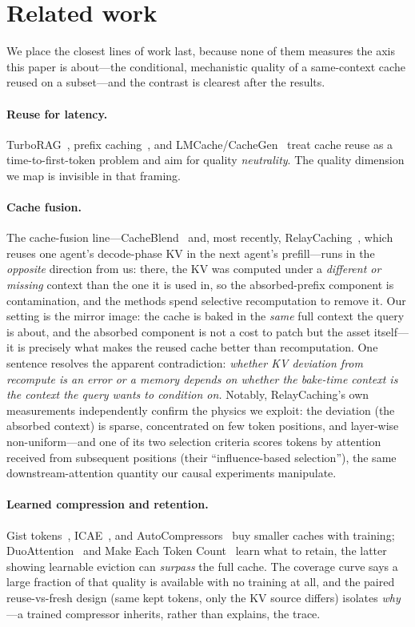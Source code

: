 \documentclass{article} %
\begin{document}
\section{Related work}
\label{sec:related}

We place the closest lines of work last, because none of them measures the axis this paper is about---the conditional, mechanistic quality of a same-context cache reused on a subset---and the contrast is clearest after the results.

\paragraph{Reuse for latency.}
TurboRAG~\citep{turborag}, prefix caching~\citep{vllm}, and LMCache/CacheGen~\citep{cachegen} treat cache reuse as a time-to-first-token problem and aim for quality \emph{neutrality}. The quality dimension we map is invisible in that framing.

\paragraph{Cache fusion.}
The cache-fusion line---CacheBlend~\citep{cacheblend} and, most recently, RelayCaching~\citep{relaycaching}, which reuses one agent's decode-phase KV in the next agent's prefill---runs in the \emph{opposite} direction from us: there, the KV was computed under a \emph{different or missing} context than the one it is used in, so the absorbed-prefix component is contamination, and the methods spend selective recomputation to remove it. Our setting is the mirror image: the cache is baked in the \emph{same} full context the query is about, and the absorbed component is not a cost to patch but the asset itself---it is precisely what makes the reused cache better than recomputation. One sentence resolves the apparent contradiction: \emph{whether KV deviation from recompute is an error or a memory depends on whether the bake-time context is the context the query wants to condition on.} Notably, RelayCaching's own measurements independently confirm the physics we exploit: the deviation (the absorbed context) is sparse, concentrated on few token positions, and layer-wise non-uniform---and one of its two selection criteria scores tokens by attention received from subsequent positions (their ``influence-based selection''), the same downstream-attention quantity our causal experiments manipulate.

\paragraph{Learned compression and retention.}
Gist tokens~\citep{gist}, ICAE~\citep{icae}, and AutoCompressors~\citep{autocompressors} buy smaller caches with training; DuoAttention~\citep{duoattention} and Make Each Token Count~\citep{maketokencount} learn what to retain, the latter showing learnable eviction can \emph{surpass} the full cache. The coverage curve says a large fraction of that quality is available with no training at all, and the paired reuse-vs-fresh design (same kept tokens, only the KV source differs) isolates \emph{why}---a trained compressor inherits, rather than explains, the trace.
\end{document}
